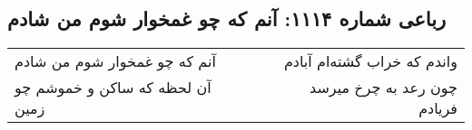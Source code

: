 \begin{center}
\section*{رباعی شماره ۱۱۱۴: آنم که چو غمخوار شوم من شادم}
\label{sec:1114}
\begin{longtable}{l p{0.5cm} r}
آنم که چو غمخوار شوم من شادم
&&
واندم که خراب گشته‌ام آبادم
\\
آن لحظه که ساکن و خموشم چو زمین
&&
چون رعد به چرخ میرسد فریادم
\\
\end{longtable}
\end{center}
